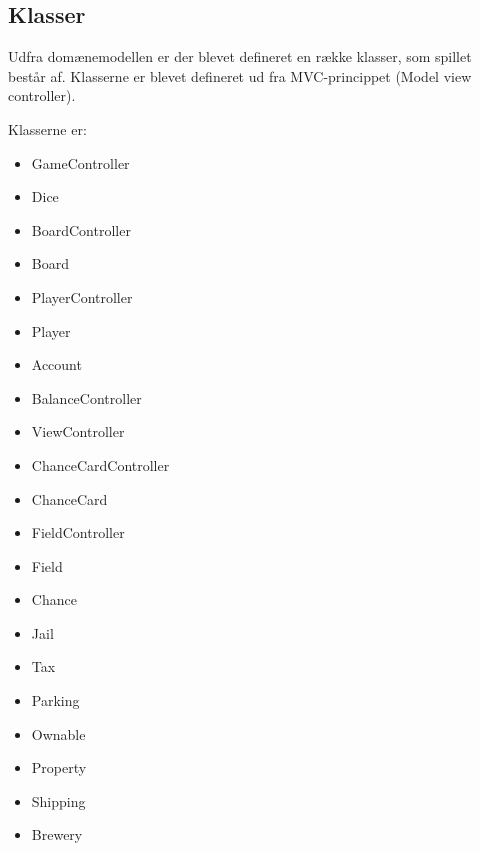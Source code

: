 \subsection{Klasser}
Udfra domænemodellen er der blevet defineret en række klasser, som spillet består af. Klasserne er blevet defineret ud fra MVC-princippet (Model view controller). 

Klasserne er:

\begin{itemize}
    \item GameController
    \item Dice
    \item BoardController
    \item Board
    \item PlayerController
    \item Player
    \item Account
    \item BalanceController
    \item ViewController
    \item ChanceCardController
    \item ChanceCard
    \item FieldController
    \item Field
    \item Chance
    \item Jail
    \item Tax
    \item Parking
    \item Ownable
    \item Property
    \item Shipping
    \item Brewery
\end{itemize}



























